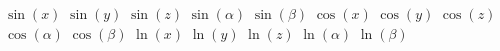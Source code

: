 $ \sin(x) $
$ \sin(y) $
$ \sin(z) $
$ \sin(\alpha) $
$ \sin(\beta) $
$ \cos(x) $
$ \cos(y) $
$ \cos(z) $
$ \cos(\alpha) $
$ \cos(\beta) $
$ \ln(x) $
$ \ln(y) $
$ \ln(z) $
$ \ln(\alpha) $
$ \ln(\beta) $
